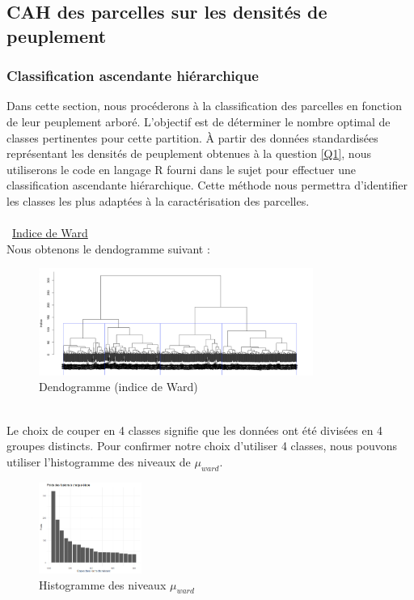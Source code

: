 \documentclass{article}
\begin{document}
\subsection{CAH des parcelles sur les densités de peuplement}
\subsubsection{Classification ascendante hiérarchique}
Dans cette section, nous procéderons à la classification des parcelles en fonction de leur peuplement arboré. L'objectif est de déterminer le nombre optimal de classes pertinentes pour cette partition. À partir des données standardisées représentant les densités de peuplement obtenues à la question \ref{Q1}, nous utiliserons le code en langage R fourni dans le sujet pour effectuer une classification ascendante hiérarchique. Cette méthode nous permettra d’identifier les classes les plus adaptées à la caractérisation des parcelles.
\\\\
\textbullet\ \underline{Indice de Ward}
\\
Nous obtenons le dendogramme suivant :
\begin{figure}[h]
    \centering
    \includegraphics[width=0.8\textwidth]{wardC.png}
    \caption{Dendogramme (indice de Ward)}
    \label{fig:Ward} 
\end{figure}
\\
Le choix de couper en 4 classes signifie que les données ont été divisées en 4 groupes distincts. 
Pour confirmer notre choix d’utiliser 4 classes, nous pouvons utiliser l’histogramme des niveaux de $\mu_{ward}$.
\begin{figure}[h]
    \centering
    \includegraphics[width=0.3\textwidth]{histoward.png}
    \caption{Histogramme des niveaux $\mu_{ward}$}
    \label{fig:HWard} 
\end{figure}
\end{document}
